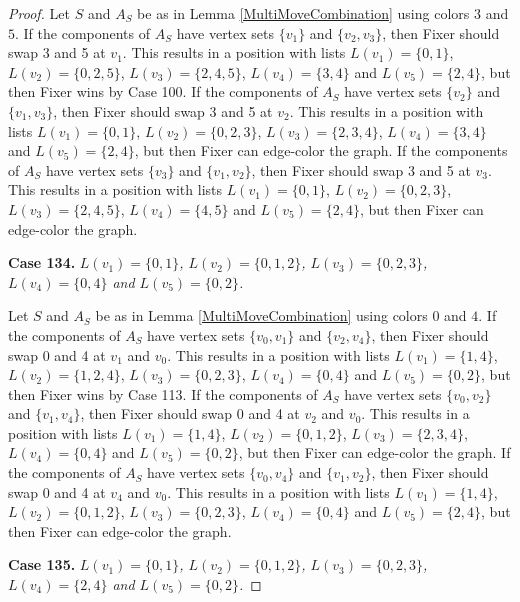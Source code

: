 \documentclass[12pt]{amsart}
\theoremstyle{plain}
\theoremstyle{definition}
\theoremstyle{remark}
\begin{document}
\begin{proof}
Let $S$ and $A_S$ be as in Lemma \ref{MultiMoveCombination} using colors $3$ and $5$. If the components of $A_S$ have vertex sets $\{v_1\}$ and $\{v_2, v_3\}$, then Fixer should swap 3 and 5 at $v_1$. This results in a position with lists $L(v_1) = \{0, 1\}$, $L(v_2) = \{0, 2, 5\}$, $L(v_3) = \{2, 4, 5\}$, $L(v_4) = \{3, 4\}$ and $L(v_5) = \{2, 4\}$, but then Fixer wins by Case 100.
If the components of $A_S$ have vertex sets $\{v_2\}$ and $\{v_1, v_3\}$, then Fixer should swap 3 and 5 at $v_2$. This results in a position with lists $L(v_1) = \{0, 1\}$, $L(v_2) = \{0, 2, 3\}$, $L(v_3) = \{2, 3, 4\}$, $L(v_4) = \{3, 4\}$ and $L(v_5) = \{2, 4\}$, but then Fixer can edge-color the graph.
If the components of $A_S$ have vertex sets $\{v_3\}$ and $\{v_1, v_2\}$, then Fixer should swap 3 and 5 at $v_3$. This results in a position with lists $L(v_1) = \{0, 1\}$, $L(v_2) = \{0, 2, 3\}$, $L(v_3) = \{2, 4, 5\}$, $L(v_4) = \{4, 5\}$ and $L(v_5) = \{2, 4\}$, but then Fixer can edge-color the graph.

\noindent\textbf{Case 134.  }\textit{$L(v_1) = \{0, 1\}$, $L(v_2) = \{0, 1, 2\}$, $L(v_3) = \{0, 2, 3\}$, $L(v_4) = \{0, 4\}$ and $L(v_5) = \{0, 2\}$.}

Let $S$ and $A_S$ be as in Lemma \ref{MultiMoveCombination} using colors $0$ and $4$. If the components of $A_S$ have vertex sets $\{v_0, v_1\}$ and $\{v_2, v_4\}$, then Fixer should swap 0 and 4 at $v_1$ and $v_0$. This results in a position with lists $L(v_1) = \{1, 4\}$, $L(v_2) = \{1, 2, 4\}$, $L(v_3) = \{0, 2, 3\}$, $L(v_4) = \{0, 4\}$ and $L(v_5) = \{0, 2\}$, but then Fixer wins by Case 113.
If the components of $A_S$ have vertex sets $\{v_0, v_2\}$ and $\{v_1, v_4\}$, then Fixer should swap 0 and 4 at $v_2$ and $v_0$. This results in a position with lists $L(v_1) = \{1, 4\}$, $L(v_2) = \{0, 1, 2\}$, $L(v_3) = \{2, 3, 4\}$, $L(v_4) = \{0, 4\}$ and $L(v_5) = \{0, 2\}$, but then Fixer can edge-color the graph.
If the components of $A_S$ have vertex sets $\{v_0, v_4\}$ and $\{v_1, v_2\}$, then Fixer should swap 0 and 4 at $v_4$ and $v_0$. This results in a position with lists $L(v_1) = \{1, 4\}$, $L(v_2) = \{0, 1, 2\}$, $L(v_3) = \{0, 2, 3\}$, $L(v_4) = \{0, 4\}$ and $L(v_5) = \{2, 4\}$, but then Fixer can edge-color the graph.

\noindent\textbf{Case 135.  }\textit{$L(v_1) = \{0, 1\}$, $L(v_2) = \{0, 1, 2\}$, $L(v_3) = \{0, 2, 3\}$, $L(v_4) = \{2, 4\}$ and $L(v_5) = \{0, 2\}$.}


\end{proof}
\end{document}
